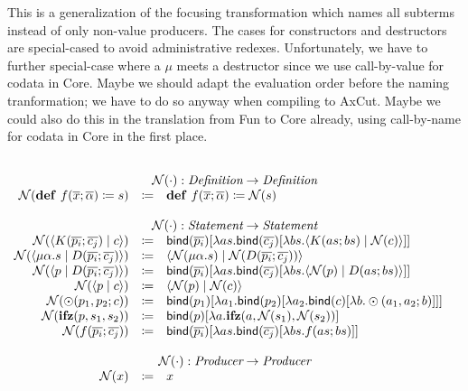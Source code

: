 This is a generalization of the focusing transformation which names all subterms instead of only non-value producers.
The cases for constructors and destructors are special-cased to avoid administrative redexes.
Unfortunately, we have to further special-case where a $\mu$ meets a destructor since we use call-by-value for codata in Core.
Maybe we should adapt the evaluation order before the naming tranformation; we have to do so anyway when compiling to AxCut.
Maybe we could also do this in the translation from Fun to Core already, using call-by-name for codata in Core in the first place.

\[
  \begin{array}{rcll}
    \\
    \multicolumn{4}{c}{\name{\cdot} : \emph{Definition} \rightarrow \emph{Definition}}\\
    \name{\defi{f(\overline{x}; \overline{\alpha})}{s}} & \coloneq & \defi{f(\overline{x}; \overline{\alpha})}{\name{s}} & \\
    \\
    \multicolumn{4}{c}{\name{\cdot} : \emph{Statement} \rightarrow \emph{Statement}}\\
    \name{\cut{K(\overline{p_i}; \overline{c_j})}{c}} & \coloneq & \bind{\overline{p_i}}{\lambda as.\bind{\overline{c_j}}{\lambda bs.\cut{K(as; bs)}{\name{c}}}} & \\
    \name{\cut{\mu\alpha.s}{D(\overline{p_i}; \overline{c_j})}} & \coloneq & \cut{\name{\mu\alpha.s}}{\name{D(\overline{p_i}; \overline{c_j})}} & \\
    \name{\cut{p}{D(\overline{p_i}; \overline{c_j})}} & \coloneq & \bind{\overline{p_i}}{\lambda as.\bind{\overline{c_j}}{\lambda bs.\cut{\name{p}}{D(as; bs)}}} & \\
    \name{\cut{p}{c}} & \coloneq & \cut{\name{p}}{\name{c}} & \\
    \name{\odot(p_1, p_2; c)}{} & \coloneq & \bind{p_1}{\lambda a_1.\bind{p_2}{\lambda a_2.\bind{c}{\lambda b.\odot(a_1, a_2; b)}}} & \\
    \name{\ifz{p}{s_1}{s_2}}{} & \coloneq & \bind{p}{\lambda a.\ifz{a}{\name{s_1}}{\name{s_2}}} & \\
    \name{f(\overline{p_i}; \overline{c_j})}{} & \coloneq & \bind{\overline{p_i}}{\lambda as.\bind{\overline{c_j}}{\lambda bs.f(as; bs)}} & \\
    \\
    \multicolumn{4}{c}{\name{\cdot} : \emph{Producer} \rightarrow \emph{Producer}}\\
    \name{x} & \coloneq & x & \\

\end{array}\]
